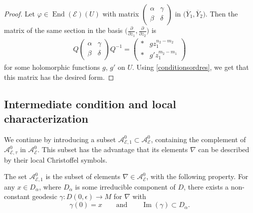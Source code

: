 \documentclass[pdftex]{sigma}
\newcommand{\der}[2]{\frac{\partial #1}{\partial#2}}
\numberwithin{equation}{section}
\begin{document}
\begin{proof}
 Let $\varphi \in \operatorname{End}(\mathcal{E})(U)$ with matrix $\left(\begin{smallmatrix} \alpha & \gamma \\ \beta & \delta \end{smallmatrix}\right)$ in $\big(\overline{Y}_1,\overline{Y}_2\big)$. Then the matrix of the same section in the basis $\big(\der{}{z_1},\der{}{z_2}\big)$ is
 \begin{gather*} Q \begin{pmatrix} \alpha & \gamma \\ \beta & \delta \end{pmatrix} Q^{-1} = \begin{pmatrix} * & g z_1^{n_2-m_2}\\ * & g' z_1^{m_2-m_1} \end{pmatrix} \end{gather*}
 for some holomorphic functions $g$, $g'$ on $U$. Using \eqref{conditionsordres}, we get that this matrix has the desired form.
\end{proof}

\subsection{Intermediate condition and local characterization}
We continue by introducing a subset $\mathcal{A}^0_{\mathcal{E},1}\subset \mathcal{A}_\mathcal{E}^0$, containing the complement of $\mathcal{A}^0_{\mathcal{E},\tau}$ in $\mathcal{A}^0_{\mathcal{E}}$. This subset has the advantage that its elements $\nabla$ can be described by their local Christoffel symbols.

\begin{Definition}\label{intermediate} The set $\mathcal{A}^0_{\mathcal{E},1}$ is the subset of elements $\nabla \in \mathcal{A}^0_\mathcal{E}$, with the following property. For any $x\in D_\alpha$, where $D_\alpha$ is some irreducible component of $D$, there exists a non-constant geodesic $\gamma\colon D(0,\epsilon) \longrightarrow M$ for $\nabla$ with
\[ \gamma(0)=x \qquad \text{and} \qquad \operatorname{Im}(\gamma) \subset D_\alpha.\]
\end{Definition}
\end{document}
